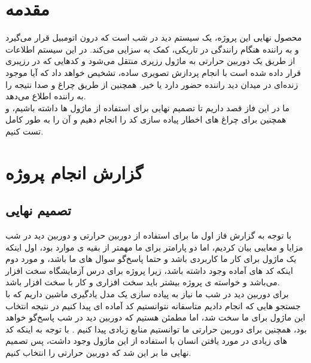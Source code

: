 \documentclass[12pt]{article}
\begin{document}
\newpage
\pagestyle{fancy}
\fancyhf{}
\fancyfoot{}
\cfoot{\thepage}
\chead{}

\newfontfamily{}

\KashidaOff
 \newcommand{\inlineLatin}[1]{
	\small{\lr{{\terminal #1}}}
}


\tableofcontents
\listoffigures
\listoftables

\newpage
\section{مقدمه}

محصول نهایی این پروژه، یک سیستم دید در شب است که درون اتومبیل قرار می‌گیرد و به راننده هنگام رانندگی در تاریکی، کمک به سزایی می‌کند. در این سیستم اطلاعات از طریق یک دوربین حرارتی به ماژول رزپری منتقل می‌شود و کدهایی که در رزپبری قرار داده شده است با انجام پردازش تصویری ساده، تشخیص خواهد داد که آیا موجود زنده‌ای در میدان دید راننده حضور دارد یا خیر. همچنین از طریق چراغ و صدا نتیجه را به راننده اطلاع می‌دهد.
\\

ما در این فاز قصد داریم تا تصمیم نهایی برای استفاده از ماژول ها داشته باشیم، و همچنین برای چراغ های اخطار پیاده سازی کد را انجام دهیم و آن را به طور کامل تست کنیم. 

\section{گزارش انجام پروژه}
\subsection{تصمیم نهایی}

با توجه به گزارش فاز اول ما برای استفاده از دوربین حرارتی و دوربین دید در شب مزایا و معایبی بیان کردیم، اما دو پارامتر برای ما مهمتر از بقیه ی موارد بود، اول اینکه یک ماژول برای کار ما کاربردی باشد و حتما پاسخ‌گو سوال های ما باشد، و مورد دوم اینکه کد های آماده وجود داشته باشد، زیرا پروژه برای درس آزمایشگاه سخت افزار می‌باشد و خواسته ی پروژه بیشتر باید سخت افزاری و کار با سخت افزار باشد.
\\
برای دوربین دید در شب ما نیاز به پیاده سازی یک مدل یادگیری ماشین داریم که با جستجو هایی که انجام دادیم متاسفانه نتوانستیم کد آماده ای پیدا کنیم در نتیجه انتخاب این ماژول برای ما سخت شد، اما مطمئن هستیم که دوربین دید در شب پاسخ‌گو خواهد بود، همچنین برای دوربین حرارتی ما توانستیم منابع زیادی پیدا کنیم  . با توجه به اینکه کد های زیادی در مورد یافتن انسان با استفاده از این ماژول وجود داشت، پس تصمیم نهایی ما بر این شد که دوربین حرارتی را انتخاب کنیم.
\end{document}
